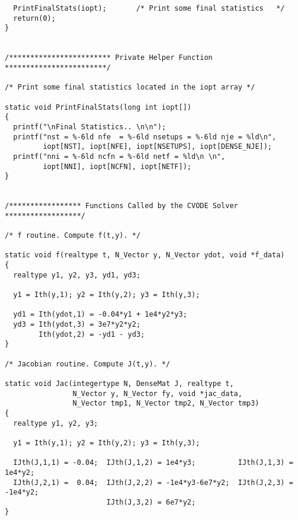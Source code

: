 \begin{verbatim}
  PrintFinalStats(iopt);       /* Print some final statistics   */
  return(0);
}


/************************ Private Helper Function ************************/

/* Print some final statistics located in the iopt array */

static void PrintFinalStats(long int iopt[])
{
  printf("\nFinal Statistics.. \n\n");
  printf("nst = %-6ld nfe  = %-6ld nsetups = %-6ld nje = %ld\n",
         iopt[NST], iopt[NFE], iopt[NSETUPS], iopt[DENSE_NJE]);
  printf("nni = %-6ld ncfn = %-6ld netf = %ld\n \n",
         iopt[NNI], iopt[NCFN], iopt[NETF]);
}


/***************** Functions Called by the CVODE Solver ******************/

/* f routine. Compute f(t,y). */

static void f(realtype t, N_Vector y, N_Vector ydot, void *f_data)
{
  realtype y1, y2, y3, yd1, yd3;

  y1 = Ith(y,1); y2 = Ith(y,2); y3 = Ith(y,3);

  yd1 = Ith(ydot,1) = -0.04*y1 + 1e4*y2*y3;
  yd3 = Ith(ydot,3) = 3e7*y2*y2;
        Ith(ydot,2) = -yd1 - yd3;
}

/* Jacobian routine. Compute J(t,y). */

static void Jac(integertype N, DenseMat J, realtype t,
                N_Vector y, N_Vector fy, void *jac_data,
                N_Vector tmp1, N_Vector tmp2, N_Vector tmp3)
{
  realtype y1, y2, y3;

  y1 = Ith(y,1); y2 = Ith(y,2); y3 = Ith(y,3);

  IJth(J,1,1) = -0.04;  IJth(J,1,2) = 1e4*y3;          IJth(J,1,3) = 1e4*y2;
  IJth(J,2,1) =  0.04;  IJth(J,2,2) = -1e4*y3-6e7*y2;  IJth(J,2,3) = -1e4*y2;
                        IJth(J,3,2) = 6e7*y2;
}
\end{verbatim}